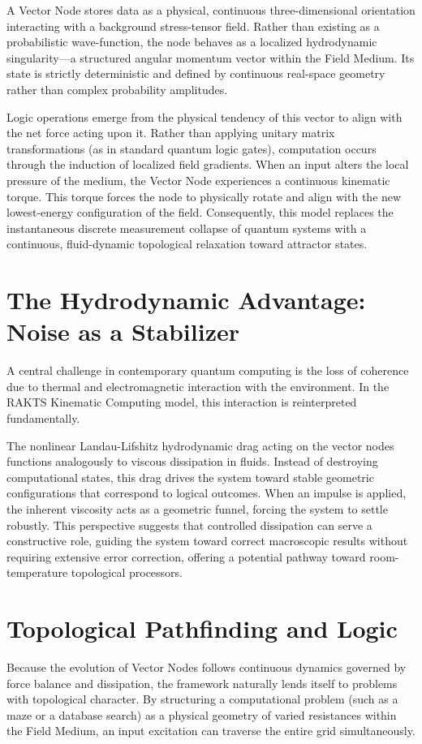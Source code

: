 \documentclass[12pt]{article}
\begin{document}
A Vector Node stores data as a physical, continuous three-dimensional orientation interacting with a background stress-tensor field. Rather than existing as a probabilistic wave-function, the node behaves as a localized hydrodynamic singularity---a structured angular momentum vector within the Field Medium. Its state is strictly deterministic and defined by continuous real-space geometry rather than complex probability amplitudes.

Logic operations emerge from the physical tendency of this vector to align with the net force acting upon it. Rather than applying unitary matrix transformations (as in standard quantum logic gates), computation occurs through the induction of localized field gradients. When an input alters the local pressure of the medium, the Vector Node experiences a continuous kinematic torque. This torque forces the node to physically rotate and align with the new lowest-energy configuration of the field. Consequently, this model replaces the instantaneous discrete measurement collapse of quantum systems with a continuous, fluid-dynamic topological relaxation toward attractor states.

\section{The Hydrodynamic Advantage: Noise as a Stabilizer}
A central challenge in contemporary quantum computing is the loss of coherence due to thermal and electromagnetic interaction with the environment. In the RAKTS Kinematic Computing model, this interaction is reinterpreted fundamentally. 

The nonlinear Landau-Lifshitz hydrodynamic drag acting on the vector nodes functions analogously to viscous dissipation in fluids. Instead of destroying computational states, this drag drives the system toward stable geometric configurations that correspond to logical outcomes. When an impulse is applied, the inherent viscosity acts as a geometric funnel, forcing the system to settle robustly. This perspective suggests that controlled dissipation can serve a constructive role, guiding the system toward correct macroscopic results without requiring extensive error correction, offering a potential pathway toward room-temperature topological processors.

\section{Topological Pathfinding and Logic}
Because the evolution of Vector Nodes follows continuous dynamics governed by force balance and dissipation, the framework naturally lends itself to problems with topological character. By structuring a computational problem (such as a maze or a database search) as a physical geometry of varied resistances within the Field Medium, an input excitation can traverse the entire grid simultaneously. 
\end{document}
